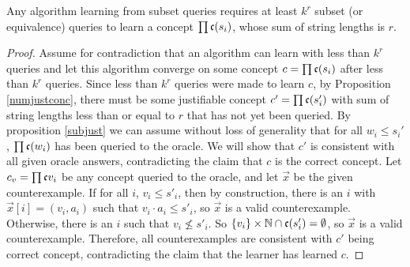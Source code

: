 \documentclass[11pt]{amsart}
\begin{document}
\begin{theorem}
Any algorithm learning from subset queries requires at least $k^r$ subset (or equivalence) queries to learn a concept $\prod \mathfrak{c}(s_i)$, whose sum of string lengths is $r$.
\end{theorem}
\begin{proof}
Assume for contradiction that an algorithm can learn with less than $k^r$ queries and let this algorithm converge on some concept $c = \prod \mathfrak{c}(s_i)$ after less than $k^r$ queries. 
Since less than $k^r$ queries were made to learn $c$, by Proposition \ref{numjustconc}, there must be some justifiable concept $c' = \prod \mathfrak{c}(s'_i)$ with sum of string lengths less than or equal to $r$ that has not yet been queried.
By proposition \ref{subjust} we can assume without loss of generality that for all $w_i \le s_i'$, $\prod \mathfrak{c}(w_i)$ has been queried to the oracle.
We will show that $c'$ is consistent with all given oracle answers, contradicting the claim that $c$ is the correct concept. 
Let $c_v = \prod \mathfrak{c}{v_i}$ be any concept queried to the oracle, and let $\vec{x}$ be the given counterexample.
If for all $i$, $v_i \le s'_i$, then by construction, there is an $i$ with $\vec{x}[i] = (v_i, a_i)$ such that $v_i \cdot a_i \le s'_i$, so $\vec{x}$ is a valid counterexample.
Otherwise, there is an $i$ such that $v_i \not\le s'_i$. 
So $\{v_i\} \times \mathbb{N}  \cap \mathfrak{c}(s'_i) = \emptyset$, so $\vec{x}$ is a valid counterexample. 
Therefore, all counterexamples are consistent with $c'$ being correct concept, contradicting the claim that the learner has learned $c$. 
\end{proof}
\end{document}
